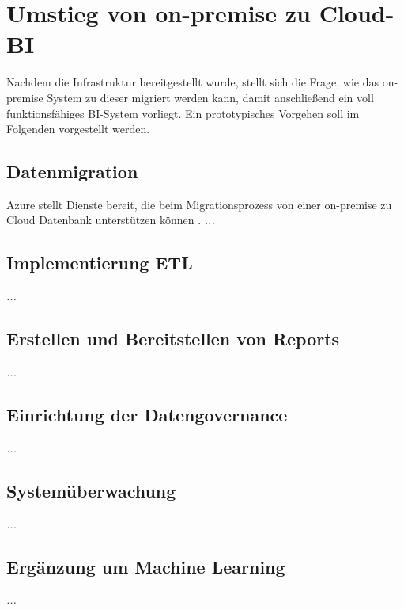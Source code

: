 \section{Umstieg von on-premise zu Cloud-BI} \label{sec:praktischeUmsetzung:Migration}
Nachdem die Infrastruktur bereitgestellt wurde, stellt sich die Frage, wie das on-premise System zu dieser migriert werden kann, damit anschließend ein voll funktionsfähiges BI-System vorliegt. Ein prototypisches Vorgehen soll im Folgenden vorgestellt werden.

\subsection{Datenmigration}
Azure stellt Dienste bereit, die beim Migrationsprozess von einer on-premise zu Cloud Datenbank unterstützen können \cite{chilberto_building_2020}. 
\textit{...}

\subsection{Implementierung ETL}
\textit{...}

\subsection{Erstellen und Bereitstellen von Reports}
\textit{...}

\subsection{Einrichtung der Datengovernance}
\textit{...}

\subsection{Systemüberwachung}
\textit{...}

\subsection{Ergänzung um Machine Learning}
\textit{...}